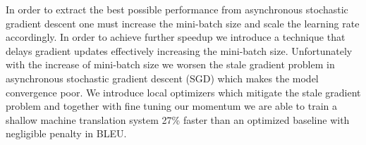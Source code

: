 In order to extract the best possible performance from asynchronous stochastic gradient descent one must increase the mini-batch size and scale the learning rate accordingly. In order to achieve further speedup we introduce a technique that delays gradient updates  effectively increasing the mini-batch size. Unfortunately with the increase of mini-batch size we worsen the stale gradient problem in asynchronous stochastic gradient descent (SGD) which makes the model convergence poor. We introduce local optimizers which mitigate the stale gradient problem and together with fine tuning our momentum we are able to train a shallow machine translation system 27\% faster than an optimized baseline with negligible penalty in BLEU.
